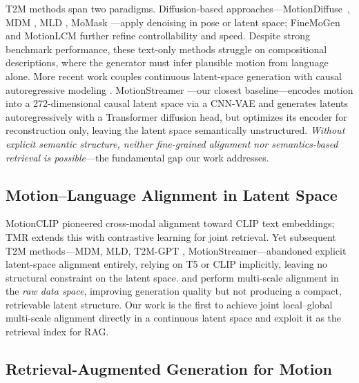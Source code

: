 \documentclass{article}
\begin{document}
T2M methods span two paradigms. Diffusion-based approaches---MotionDiffuse~\citep{zhang2024motiondiffuse}, MDM \citep{tevet2022human}, MLD \citep{chen2023executing}, MoMask \citep{guo2024momask}---apply denoising in pose or latent space; FineMoGen \citep{zhang2023finemogen} and MotionLCM \citep{dai2024motionlcm} further refine controllability and speed.
Despite strong benchmark performance, these text-only methods struggle on compositional descriptions, where the generator must infer plausible motion from language alone.
More recent work couples continuous latent-space generation with causal autoregressive modeling \citep{meng2024rethinking,meng2025absolute,xiao2025motionstreamer,zhu2025motiongpt3,he2025molingo,yu2026causal}.
MotionStreamer \citep{xiao2025motionstreamer}---our closest baseline---encodes motion into a 272-dimensional causal latent space via a CNN-VAE and generates latents autoregressively with a Transformer diffusion head, but optimizes its encoder for reconstruction only, leaving the latent space semantically unstructured.
\emph{Without explicit semantic structure, neither fine-grained alignment nor semantics-based retrieval is possible}---the fundamental gap our work addresses.

\subsection{Motion--Language Alignment in Latent Space}

MotionCLIP \citep{tevet2022motionclip} pioneered cross-modal alignment toward CLIP \citep{pmlr-v139-radford21a} text embeddings; TMR \citep{petrovich2023tmr} extends this with contrastive learning for joint retrieval.
Yet subsequent T2M methods---MDM, MLD, T2M-GPT \citep{zhang2023generating}, MotionStreamer---abandoned explicit latent-space alignment entirely, relying on T5 \citep{raffel2020exploring} or CLIP implicitly, leaving no structural constraint on the latent space.
\citet{li2025unimotion} and \citet{zhang2025kinmo} perform multi-scale alignment in the \emph{raw data space}, improving generation quality but not producing a compact, retrievable latent structure.
Our work is the first to achieve joint local--global multi-scale alignment directly in a continuous latent space and exploit it as the retrieval index for RAG.

\subsection{Retrieval-Augmented Generation for Motion}
\end{document}
